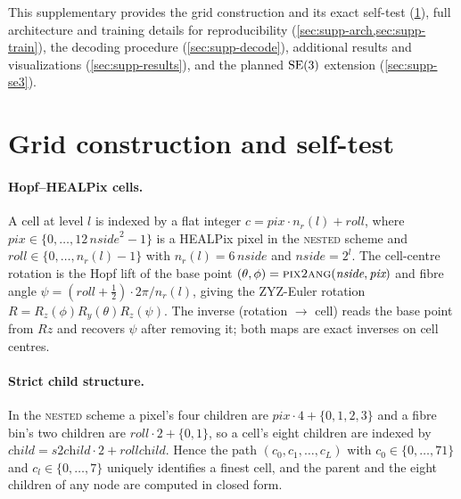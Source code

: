 \clearpage
\setcounter{page}{1}
\maketitlesupplementary


\noindent This supplementary provides the grid construction and its exact
self-test (\cref{sec:supp-grid}), full architecture and training details for
reproducibility (\cref{sec:supp-arch,sec:supp-train}), the decoding procedure
(\cref{sec:supp-decode}), additional results and visualizations
(\cref{sec:supp-results}), and the planned $\mathrm{SE}(3)$ extension
(\cref{sec:supp-se3}).

\section{Grid construction and self-test}
\label{sec:supp-grid}

\paragraph{Hopf--HEALPix cells.}
A cell at level $l$ is indexed by a flat integer $c = \textit{pix}\cdot n_r(l) +
\textit{roll}$, where $\textit{pix}\in\{0,\dots,12\,\textit{nside}^2-1\}$ is a
HEALPix pixel in the \textsc{nested} scheme and $\textit{roll}\in\{0,\dots,
n_r(l)-1\}$ with $n_r(l)=6\,\textit{nside}$ and $\textit{nside}=2^{l}$. The
cell-centre rotation is the Hopf lift of the base point
$(\theta,\phi)=\textsc{pix2ang}(\textit{nside},\textit{pix})$ and fibre angle
$\psi=(\textit{roll}+\tfrac12)\cdot 2\pi/n_r(l)$, giving the ZYZ-Euler rotation
$R=R_z(\phi)R_y(\theta)R_z(\psi)$. The inverse (rotation $\rightarrow$ cell) reads
the base point from $R\hat{z}$ and recovers $\psi$ after removing it; both maps are
exact inverses on cell centres.

\paragraph{Strict child structure.}
In the \textsc{nested} scheme a pixel's four children are $\textit{pix}\cdot4+\{0,
1,2,3\}$ and a fibre bin's two children are $\textit{roll}\cdot2+\{0,1\}$, so a
cell's eight children are indexed by $\textit{child}=\textit{s2child}\cdot2+
\textit{rollchild}$. Hence the path $(c_0,c_1,\dots,c_L)$ with $c_0\in\{0,\dots,
71\}$ and $c_l\in\{0,\dots,7\}$ uniquely identifies a finest cell, and the parent
and the eight children of any node are computed in closed form.

